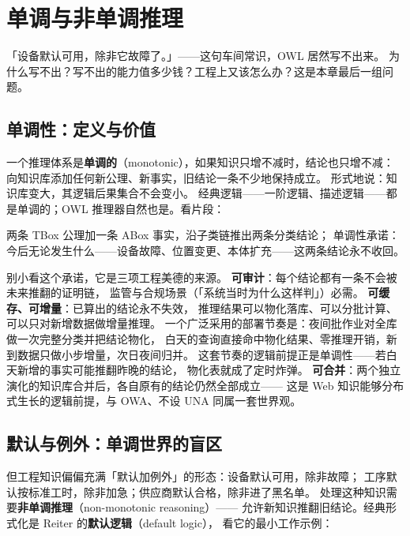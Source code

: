 \section{单调与非单调推理}

「设备默认可用，除非它故障了。」——这句车间常识，OWL 居然写不出来。
为什么写不出？写不出的能力值多少钱？工程上又该怎么办？这是本章最后一组问题。

\subsection{单调性：定义与价值}

一个推理体系是\textbf{单调的}（monotonic），如果知识只增不减时，结论也只增不减：
向知识库添加任何新公理、新事实，旧结论一条不少地保持成立。
形式地说：知识库变大，其逻辑后果集合不会变小。
经典逻辑——一阶逻辑、描述逻辑——都是单调的；OWL 推理器自然也是。看片段：



两条 TBox 公理加一条 ABox 事实，沿子类链推出两条分类结论；
单调性承诺：今后无论发生什么——设备故障、位置变更、本体扩充——这两条结论永不收回。

别小看这个承诺，它是三项工程美德的来源。
\textbf{可审计}：每个结论都有一条不会被未来推翻的证明链，
监管与合规场景（「系统当时为什么这样判」）必需。
\textbf{可缓存、可增量}：已算出的结论永不失效，
推理结果可以物化落库、可以分批计算、可以只对新增数据做增量推理。
一个广泛采用的部署节奏是：夜间批作业对全库做一次完整分类并把结论物化，
白天的查询直接命中物化结果、零推理开销，新到数据只做小步增量，次日夜间归并。
这套节奏的逻辑前提正是单调性——若白天新增的事实可能推翻昨晚的结论，
物化表就成了定时炸弹。
\textbf{可合并}：两个独立演化的知识库合并后，各自原有的结论仍然全部成立——
这是 Web 知识能够分布式生长的逻辑前提，与 OWA、不设 UNA 同属一套世界观。

\subsection{默认与例外：单调世界的盲区}

但工程知识偏偏充满「默认加例外」的形态：设备默认可用，除非故障；
工序默认按标准工时，除非加急；供应商默认合格，除非进了黑名单。
处理这种知识需要\textbf{非单调推理}（non-monotonic reasoning）——
允许新知识推翻旧结论。经典形式化是 Reiter 的\textbf{默认逻辑}（default logic），
看它的最小工作示例：



